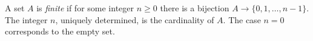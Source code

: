 
A set $A$ is \emph{finite} if for some integer $n\ge0$ there is a bijection $A\to\{0,1,\ldots,n-1\}$. The integer $n$, uniquely determined, is the cardinality of $A$. The case $n=0$ corresponds to the empty set.
